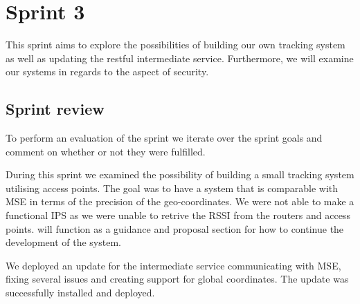 \chapter{Sprint 3}\label{cha:sprint3}
This sprint aims to explore the possibilities of building our own tracking system as well as updating the restful intermediate service. Furthermore, we will examine our systems in regards to the aspect of security.




\section{Sprint review}
To perform an evaluation of the sprint we iterate over the sprint goals and comment on whether or not they were fulfilled.

During this sprint we examined the possibility of building a small tracking system utilising access points. The goal was to have a system that is comparable with MSE in terms of the precision of the geo-coordinates. We were not able to make a functional IPS as we were unable to retrive the RSSI from the routers and access points.  will function as a guidance and proposal section for how to continue the development of the system.

We deployed an update for the intermediate service communicating with MSE, fixing several issues and creating support for global coordinates. The update was successfully installed and deployed.

